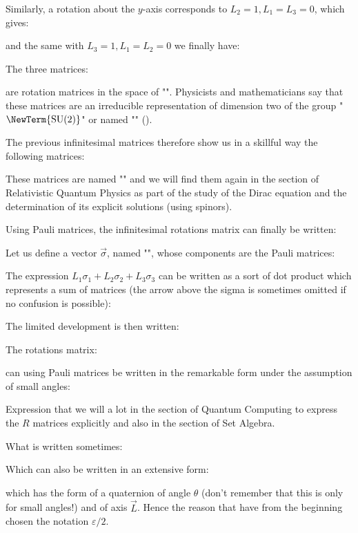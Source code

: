 	Similarly, a rotation about the $y$-axis corresponds to $L_2=1,L_1=L_3=0$, which gives:
	
	and the same with $L_3=1,L_1=L_2=0$ we finally have:
	
	The three matrices:
	
	are rotation matrices in the space of "". Physicists and mathematicians say that these matrices are an irreducible representation of dimension two of the group "$\NewTerm{\text{SU} (2)}$" or named  "" ().
	
	The previous infinitesimal matrices therefore show us in a skillful way the following matrices:
	
	These matrices are named "" and we will find them again in the section of Relativistic Quantum Physics as part of the study of the Dirac equation and the determination of its explicit solutions (using spinors).
	
	Using Pauli matrices, the infinitesimal rotations matrix can finally be written:
	
	Let us define a vector $\vec{\sigma}$, named "", whose components are the Pauli matrices:
	
	The expression $L_1\sigma_1+L_2\sigma_2+L_3\sigma_3$ can be written as a sort of dot product which represents a sum of matrices (the arrow above the sigma is sometimes omitted if no confusion is possible):
	
	The limited development is then written:
	
	The rotations matrix:
	
	can using Pauli matrices be written in the remarkable form under the assumption of small angles:
	
	Expression that we will a lot in the section of Quantum Computing to express the $R$ matrices explicitly and also in the section of Set Algebra.
	
	What is written sometimes:
	
	Which can also be written in an extensive form:
	
	which has the form of a quaternion of angle $\theta$ (don't remember that this is only for small angles!) and of axis $\vec{L}$. Hence the reason that  have from the beginning chosen the notation $\varepsilon/2$.
	
